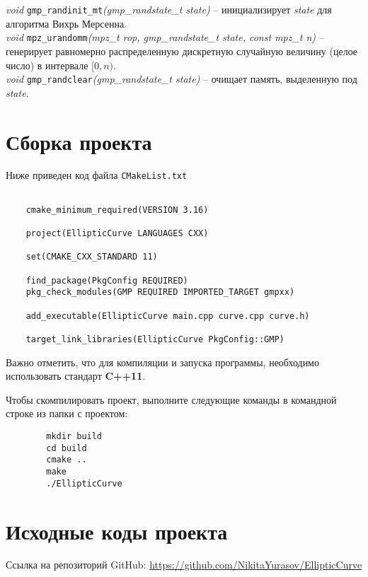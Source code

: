 \documentclass[a4paper,12pt]{article}
\begin{document}
	\textit{void} \texttt{gmp\_randinit\_mt}\textit{(gmp\_randstate\_t state)} -- инициализирует \textit{state} для алгоритма Вихрь Мерсенна.\\
	
	\textit{void} \texttt{mpz\_urandomm}\textit{(mpz\_t rop, gmp\_randstate\_t state, const mpz\_t n)} -- генерирует равномерно распределенную дискретную случайную величину (целое число) в интервале $[0, n)$.\\
	
	\textit{void} \texttt{gmp\_randclear}\textit{(gmp\_randstate\_t state)} -- очищает память, выделенную под \textit{state}.
	
	
	\newpage
	\section{Сборка проекта}
	Ниже приведен код файла \texttt{CMakeList.txt}
	\begin{verbatim}

	cmake_minimum_required(VERSION 3.16)
	
	project(EllipticCurve LANGUAGES CXX)
	
	set(CMAKE_CXX_STANDARD 11)
	
	find_package(PkgConfig REQUIRED)
	pkg_check_modules(GMP REQUIRED IMPORTED_TARGET gmpxx)
	
	add_executable(EllipticCurve main.cpp curve.cpp curve.h)
	
	target_link_libraries(EllipticCurve PkgConfig::GMP)
	\end{verbatim}
	
	Важно отметить, что для компиляции и запуска программы, необходимо использовать стандарт \textbf{C++11}.
	
	Чтобы скомпилировать проект, выполните следующие команды в командной строке из папки с проектом:
	\begin{verbatim}
		mkdir build
		cd build
		cmake ..
		make
		./EllipticCurve
	\end{verbatim}
	
	\newpage
	\section{Исходные коды проекта}
	Ссылка на репозиторий GitHub: \href{https://github.com/NikitaYurasov/EllipticCurve}{https://github.com/NikitaYurasov/EllipticCurve}
\end{document}
